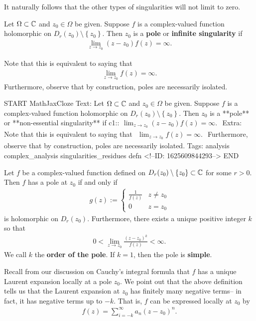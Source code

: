 \documentclass{memoir}
\begin{document}
It naturally follows that the other types of singularities will not limit to zero.

\begin{defn}[Poles]
	Let \(\Omega \subset \mathbb{C}\) and \(z_0 \in \Omega \) be given. Suppose \(f\) is a complex-valued function holomorphic on \(D_r(z_0)\setminus\left\{ z_0 \right\} \). Then \(z_0\) is a \textbf{pole} or \textbf{infinite singularity} if
	\begin{align*}
		\lim_{z \to z_0} (z-z_0)f(z) = \infty.
	\end{align*}
\end{defn}
Note that this is equivalent to saying that
\begin{align*}
	\lim_{z \to z_0} f(z) = \infty.
\end{align*}
Furthermore, observe that by construction, poles are necessarily isolated.

\begin{anki}
START
MathJaxCloze
Text: Let \(\Omega \subset \mathbb{C}\) and \(z_0 \in \Omega \) be given. Suppose \(f\) is a complex-valued function holomorphic on \(D_r(z_0)\setminus\left\{ z_0 \right\} \). Then \(z_0\) is a **pole** or **non-essential singularity** if
{{c1::\(\begin{align*}
        	\lim_{z \to z_0} (z-z_0)f(z) = \infty.
        \end{align*}\)}}
Extra: Note that this is equivalent to saying that
\(\begin{align*}
  	\lim_{z \to z_0} f(z) = \infty.
  \end{align*}\)
Furthermore, observe that by construction, poles are necessarily isolated.
Tags: analysis complex_analysis singularities_residues defn
<!--ID: 1625609844293-->
END
\end{anki}

\begin{prop}
	Let \(f\) be a complex-valued function defined on \(D_r(z_0)\setminus \left\{ z_0 \right\} \subset \mathbb{C}\) for some \(r>0\). Then \(f\) has a pole at \(z_0\) if and only if
	\begin{align*}
		g(z) := \begin{cases}
			\frac{1}{f(z)} & z\neq z_0\\
			0 & z=z_0
		\end{cases}
	\end{align*}
	is holomorphic on \(D_r(z_0)\). Furthermore, there exists a unique positive integer \(k\) so that
	\begin{align*}
		0 < \lim_{z \to z_0} \frac{(z-z_0)^{k}}{f(z)}< \infty.
	\end{align*}
	We call \(k\) the \textbf{order of the pole}. If \(k=1\), then the pole is \textbf{simple}.
\end{prop}
Recall from our discussion on Cauchy's integral formula that \(f\) has a unique Laurent expansion locally at a pole \(z_0\). We point out that the above definition tells us that the Laurent expansion at \(z_0\) has finitely many negative terms-- in fact, it has negative terms up to \(-k\). That is, \(f\) can be expressed locally at \(z_0\) by
\begin{align*}
	f(z) = \sum_{i=-k}^{\infty} a_n (z-z_0)^{n}.
\end{align*}
\end{document}

